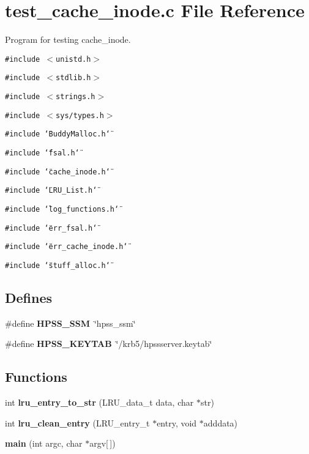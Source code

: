 \section{test\_\-cache\_\-inode.c File Reference}
\label{test__cache__inode_8c}
Program for testing cache\_\-inode. 

{\tt \#include $<$unistd.h$>$}\par
{\tt \#include $<$stdlib.h$>$}\par
{\tt \#include $<$strings.h$>$}\par
{\tt \#include $<$sys/types.h$>$}\par
{\tt \#include \char`\"{}Buddy\-Malloc.h\char`\"{}}\par
{\tt \#include \char`\"{}fsal.h\char`\"{}}\par
{\tt \#include \char`\"{}cache\_\-inode.h\char`\"{}}\par
{\tt \#include \char`\"{}LRU\_\-List.h\char`\"{}}\par
{\tt \#include \char`\"{}log\_\-functions.h\char`\"{}}\par
{\tt \#include \char`\"{}err\_\-fsal.h\char`\"{}}\par
{\tt \#include \char`\"{}err\_\-cache\_\-inode.h\char`\"{}}\par
{\tt \#include \char`\"{}stuff\_\-alloc.h\char`\"{}}\par
\subsection*{Defines}
\begin{CompactItemize}
\item 
\#define {\bf HPSS\_\-SSM}\ \char`\"{}hpss\_\-ssm\char`\"{}
\item 
\#define {\bf HPSS\_\-KEYTAB}\ \char`\"{}/krb5/hpssserver.keytab\char`\"{}
\end{CompactItemize}
\subsection*{Functions}
\begin{CompactItemize}
\item 
int {\bf lru\_\-entry\_\-to\_\-str} (LRU\_\-data\_\-t data, char $\ast$str)
\item 
int {\bf lru\_\-clean\_\-entry} (LRU\_\-entry\_\-t $\ast$entry, void $\ast$adddata)
\item 
{\bf main} (int argc, char $\ast$argv[$\,$])
\end{CompactItemize}


